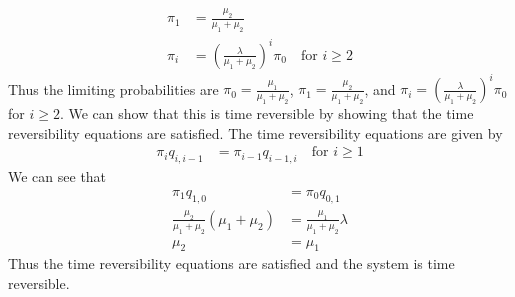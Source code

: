 \documentclass[answers,12pt,addpoints]{exam}
\begin{document}
\begin{questions}
\begin{solution}
\begin{align*}
            \pi_1 &= \frac{\mu_2}{\mu_1 + \mu_2}\\
            \pi_i &= \left(\frac{\lambda}{\mu_1 + \mu_2}\right)^i \pi_0 \quad \text{for } i \geq 2
        \end{align*}
        Thus the limiting probabilities are $\pi_0 = \frac{\mu_1}{\mu_1 + \mu_2}$, $\pi_1 = \frac{\mu_2}{\mu_1 + \mu_2}$, and $\pi_i = \left(\frac{\lambda}{\mu_1 + \mu_2}\right)^i \pi_0$ for $i \geq 2$.
        We can show that this is time reversible by showing that the time reversibility equations are satisfied. The time reversibility equations are given by
        \begin{align*}
            \pi_i q_{i,i-1} &= \pi_{i-1} q_{i-1,i} \quad \text{for } i \geq 1
        \end{align*}
        We can see that
        \begin{align*}
            \pi_1 q_{1,0} &= \pi_0 q_{0,1}\\
            \frac{\mu_2}{\mu_1 + \mu_2} (\mu_1 + \mu_2) &= \frac{\mu_1}{\mu_1 + \mu_2} \lambda\\
            \mu_2 &= \mu_1
        \end{align*}
        Thus the time reversibility equations are satisfied and the system is time reversible.
    \end{solution}

\end{questions}
\end{document}
